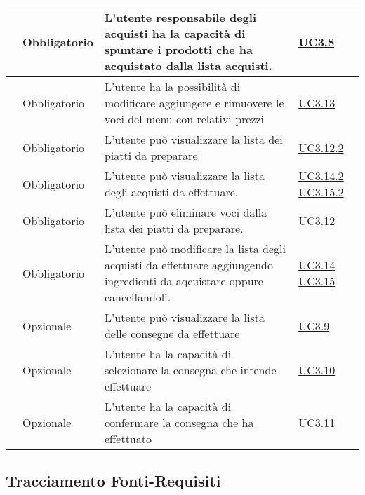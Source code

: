 \begin{longtable}{|P{1.5cm}|P{3cm}|P{6cm}|P{2.5cm}|}
	\hline \RequisitoObF\label{L28} & Obbligatorio & L’utente responsabile degli acquisti ha la capacità di spuntare i prodotti che ha acquistato dalla lista acquisti.
	 & \hyperref[UC3.8]{UC3.8} \\
	\hline \RequisitoObF\label{L29} & Obbligatorio & L’utente  ha la possibilità di modificare aggiungere e rimuovere le voci del menu con relativi prezzi & \hyperref[UC3.13]{UC3.13} \\
	\hline \RequisitoObF\label{L30} & Obbligatorio & L’utente  può visualizzare la lista dei piatti da preparare & \hyperref[UC3.12.2]{UC3.12.2} \\
	\hline \RequisitoObF\label{L31} & Obbligatorio & L’utente  può visualizzare la lista degli acquisti da effettuare. & \hyperref[UC3.14.2]{UC3.14.2} \hyperref[UC3.15.2]{UC3.15.2} \\
	\hline \RequisitoObF\label{L32} & Obbligatorio & L’utente  può eliminare voci dalla lista dei piatti da preparare. & \hyperref[UC3.12]{UC3.12} \\
	\hline \RequisitoObF\label{L53} & Obbligatorio & L’utente  può modificare la lista degli acquisti da effettuare aggiungendo ingredienti da aqcuistare oppure cancellandoli.
	 & \hyperref[UC3.14]{UC3.14} \linebreak \hyperref[UC3.15]{UC3.15} \\	 
	\hline \RequisitoOpF\label{L50} & Opzionale & L’utente  può visualizzare la lista delle consegne da effettuare & \hyperref[UC3.9]{UC3.9} \\
	\hline \RequisitoOpF\label{L51} & Opzionale & L’utente  ha la capacità di selezionare la consegna che intende effettuare & \hyperref[UC3.10]{UC3.10} \\
	\hline \RequisitoOpF\label{L52} & Opzionale & L’utente  ha la capacità di confermare la consegna che ha effettuato & \hyperref[UC3.11]{UC3.11} \\
	\hline
\end{longtable}

\subsection{Tracciamento Fonti-Requisiti}

